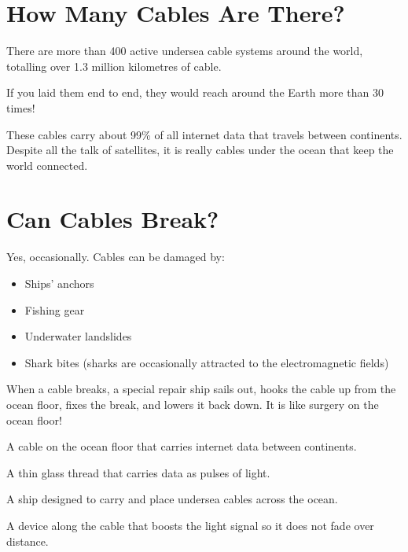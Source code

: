 \sectionrule

\section*{How Many Cables Are There?}

There are more than 400 active undersea cable systems around the world,
totalling over 1.3 million kilometres of cable.

If you laid them end to end, they would reach around the Earth more than 30 times!

These cables carry about 99\% of all internet data that travels between continents.
Despite all the talk of satellites, it is really cables under the ocean that keep the world connected.

\sectionrule

\section*{Can Cables Break?}

Yes, occasionally.
Cables can be damaged by:
\begin{itemize}
  \item Ships' anchors
  \item Fishing gear
  \item Underwater landslides
  \item Shark bites (sharks are occasionally attracted to the electromagnetic fields)
\end{itemize}

When a cable breaks, a special repair ship sails out, hooks the cable up from the ocean floor,
fixes the break, and lowers it back down.
It is like surgery on the ocean floor!

\sectionrule

\begin{newwords}
  \begin{description}[labelwidth=3.8cm, leftmargin=4cm]
    \item[\term{Undersea cable}]    A cable on the ocean floor that carries internet data between continents.
    \item[\term{Optical fibre}]     A thin glass thread that carries data as pulses of light.
    \item[\term{Cable-laying ship}] A ship designed to carry and place undersea cables across the ocean.
    \item[\term{Amplifier}]         A device along the cable that boosts the light signal so it does not fade over distance.
  \end{description}
\end{newwords}

